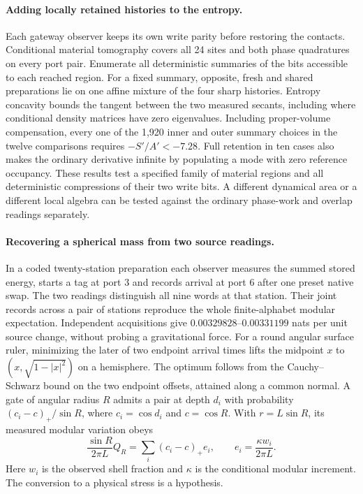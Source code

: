\documentclass[11pt]{article}
\begin{document}
\paragraph{Adding locally retained histories to the entropy.}
Each gateway observer keeps its own write parity before restoring the
contacts. Conditional material tomography covers all 24 sites and both
phase quadratures on every port pair. Enumerate all deterministic
summaries of the bits accessible to each reached region. For a fixed
summary, opposite, fresh and shared preparations lie on one affine
mixture of the four sharp histories. Entropy concavity bounds the
tangent between the two measured secants, including where conditional
density matrices have zero eigenvalues. Including proper-volume
compensation, every one of the 1,920 inner and outer summary choices in
the twelve comparisons requires $-S'/A'<-7.28$. Full retention in ten
cases also makes the ordinary derivative infinite by populating a
mode with zero reference occupancy. These results test a specified family of material
regions and all deterministic compressions of their two write bits.
A different dynamical area or a different local algebra can be tested
against the ordinary phase-work and overlap readings separately.

\paragraph{Recovering a spherical mass from two source readings.}
In a coded twenty-station preparation each observer measures the summed
stored energy, starts a tag at port 3 and records arrival at port 6
after one preset native swap. The two readings distinguish all nine words at that
station. Their joint records across a pair of stations reproduce the
whole finite-alphabet modular expectation. Independent acquisitions give
$0.00329828$--$0.00331199$ nats per unit source change, without probing
a gravitational force. For a round angular surface ruler, minimizing the
later of two endpoint arrival times lifts the midpoint $x$ to
$(x,\sqrt{1-|x|^2})$ on a hemisphere. The optimum follows from the
Cauchy--Schwarz bound on the two endpoint offsets, attained along a
common normal. A gate of angular radius $R$ admits a pair at depth $d_i$
with probability $(c_i-c)_+/\sin R$, where $c_i=\cos d_i$ and
$c=\cos R$. With $r=L\sin R$, its measured modular variation obeys
\[
\frac{\sin R}{2\pi L}Q_R=\sum_i(c_i-c)_+ e_i,
\qquad e_i=\frac{\kappa w_i}{2\pi L}.
\]
Here $w_i$ is the observed shell fraction and $\kappa$ is the conditional
modular increment. The conversion to a physical stress is a hypothesis.
\end{document}

